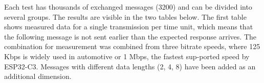 \documentclass{ctuthesis}
\begin{document}
 Each test has thousands of exchanged messages (3200) and can be divided into several groups. The results are visible in the two tables below. The first table shows measured data for a single transmission per time unit, which means that the following message is not sent earlier than the expected response arrives. The combination for measurement was combined from three bitrate speeds, where 125 Kbps is widely used in automotive or 1 Mbps, the fastest sup-ported speed by ESP32-C3. Messages with different data lengths (2, 4, 8) have been added as an additional dimension.
 
\begin{table}[htb]
    \centering
    \caption{Measured NuttX latencies, messages sent one at a time. 3200 messages were sent.}
    \label{tabulka:nuttx-oneattime}
\end{table}
\end{document}
